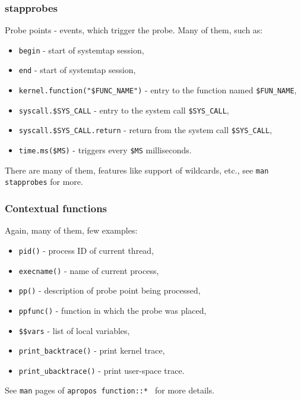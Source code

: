 \documentclass[10pt,utf8]{beamer}
\begin{document}
\begin{frame}
    \frametitle{stapprobes}
    Probe points - events, which trigger the probe. Many of them, such as:
    \begin{itemize}
        \item \texttt{begin} - start of systemtap session,
        \item \texttt{end} - start of systemtap session,
        \item \texttt{kernel.function("\$FUNC\_NAME")} - entry to the function named \texttt{\$FUN\_NAME},
        \item \texttt{syscall.\$SYS\_CALL} - entry to the system call \texttt{\$SYS\_CALL},
        \item \texttt{syscall.\$SYS\_CALL.return} - return from the system call \texttt{\$SYS\_CALL},
        \item \texttt{time.ms(\$MS)} - triggers every \texttt{\$MS} milliseconds.
    \end{itemize}
    
    \hspace{0.5cm}
    
    There are many of them, features like support of wildcards, etc., see \texttt{man stapprobes} for more.
\end{frame}

\begin{frame}
    \frametitle{Contextual functions}
    Again, many of them, few examples:
    \begin{itemize}
        \item \texttt{pid()} - process ID of current thread,
        \item \texttt{execname()} - name of current process,
        \item \texttt{pp()} - description of probe point being processed,
        \item \texttt{ppfunc()} - function in which the probe was placed,
        \item \texttt{\$\$vars} - list of local variables,
        \item \texttt{print\_backtrace()} - print kernel trace,
        \item \texttt{print\_ubacktrace()} - print user-space trace.
    \end{itemize}
    
    \hspace{0.5cm}
    
    See \texttt{man} pages of  \texttt{apropos function::* } for more details.
\end{frame}
\end{document}
